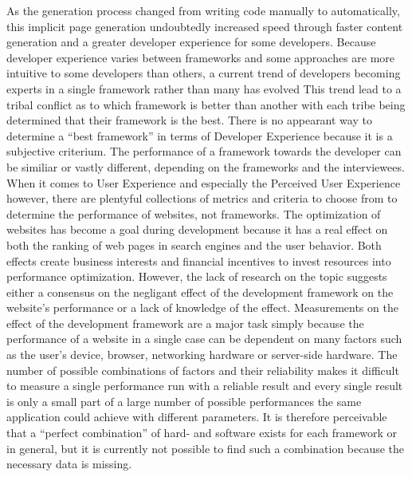 \documentclass[a4paper, fontsize=11pt]{article}
\begin{document}
As the generation process changed from writing code manually to automatically, this implicit page generation undoubtedly increased speed through faster content generation and a greater developer experience for some developers.
Because developer experience varies between frameworks and some approaches are more intuitive to some developers than others, a current trend of developers becoming experts in a single framework rather than many has evolved 
This trend lead to a tribal conflict as to which framework is better than another with each tribe being determined that their framework is the best.
There is no appearant way to determine a \enquote{best framework} in terms of Developer Experience because it is a subjective criterium.
The performance of a framework towards the developer can be similiar or vastly different, depending on the frameworks and the interviewees.
When it comes to User Experience and especially the Perceived User Experience however, there are plentyful collections of metrics and criteria to choose from to determine the performance of websites, not frameworks.
The optimization of websites has become a goal during development because it has a real effect on both the ranking of web pages in search engines and the user behavior.
Both effects create business interests and financial incentives to invest resources into performance optimization.
However, the lack of research on the topic suggests either a consensus on the negligant effect of the development framework on the website's performance or a lack of knowledge of the effect.
Measurements on the effect of the development framework are a major task simply because the performance of a website in a single case can be dependent on many factors such as the user's device, browser, networking hardware or server-side hardware.
The number of possible combinations of factors and their reliability makes it difficult to measure a single performance run with a reliable result and every single result is only a small part of a large number of possible performances the same application could achieve with different parameters.
It is therefore perceivable that a \enquote{perfect combination} of hard- and software exists for each framework or in general, but it is currently not possible to find such a combination because the necessary data is missing.
\end{document}
